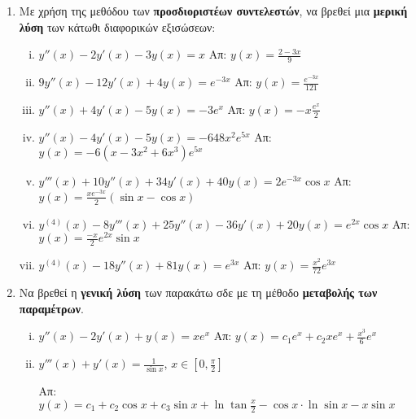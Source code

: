 \begin{enumerate}
  \item Με χρήση της μεθόδου των \textbf{προσδιοριστέων συντελεστών}, να βρεθεί μια 
    \textbf{μερική λύση} των κάτωθι διαφορικών εξισώσεων:
    \begin{enumerate}[i)]
      \item $y''(x)-2y'(x)-3y(x)=x$ \hfill Απ: $y(x)=\frac{2-3x}{9}$
      \item $9y''(x)-12y'(x)+4y(x)=e^{-3x}$ \hfill Απ: $y(x)=\frac{e^{-3x}}{121}$
      \item $y''(x)+4y'(x)-5y(x)=-3e^{x}$ \hfill Απ: $y(x)=-x\frac{e^{x}}{2}$
      \item $y''(x)-4y'(x)-5y(x)=-648x^{2}e^{5x}$ 
        \hfill Απ: $ y(x)=-6(x-3x^{2}+6x^{3})e^{5x}$
      \item $y'''(x)+10y''(x)+34y'(x)+40y(x)=2e^{-3x}\cos x$ 
        \hfill Απ: $y(x)= \frac{xe^{-3x}}{2}(\sin x - \cos x)$
      \item $y^{(4)}(x)-8y'''(x)+25y''(x)-36y'(x)+20y(x)=e^{2x}\cos x$ 
        \hfill Απ: $y(x) =\frac{-x}{2}e^{2x}\sin x$
      \item $y^{(4)}(x)-18y''(x)+81y(x)=e^{3x}$ \hfill Απ: $y(x)=\frac{x^{2}}{72}e^{3x}$
    \end{enumerate}

  \item Να βρεθεί η \textbf{γενική λύση} των παρακάτω σδε με τη μέθοδο 
    \textbf{μεταβολής των παραμέτρων}.
    \begin{enumerate}[i)]
      \item $y''(x)-2y'(x)+y(x)=xe^{x}$ 
        \hfill Απ: $y(x)=c_{1}e^{x}+c_{2}xe^{x}+\frac{x^{3}}{6}e^{x}$
      \item $y'''(x)+y'(x)=\frac{1}{\sin x}$, $x\in [0,\frac{\pi}{2}]$

        \hfill Απ: $y(x)=c_{1}+c_2\cos x+c_3 \sin x+\ln \tan \frac{x}{2}-
        \cos x\cdot\ln\sin x-x\sin x$
    \end{enumerate}


\end{enumerate}
